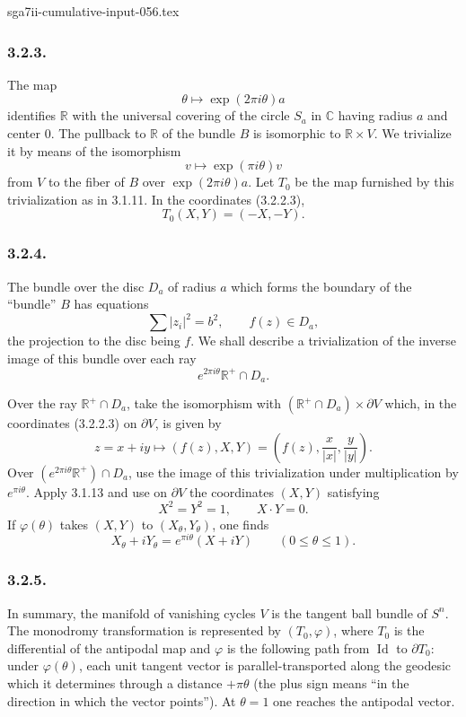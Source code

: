 \begin{filecontents*}{sga7ii-cumulative-input-056.tex}
\subsubsection*{3.2.3.}
The map
\[
\theta\longmapsto \exp(2\pi i\theta)a
\]
identifies $\mathbb R$ with the universal covering of the circle
$S_a$ in $\mathbb C$ having radius $a$ and center $0$.  The pullback
to $\mathbb R$ of the bundle $B$ is isomorphic to $\mathbb R\times V$.
We trivialize it by means of the isomorphism
\[
v\longmapsto \exp(\pi i\theta)v
\]
from $V$ to the fiber of $B$ over $\exp(2\pi i\theta)a$.  Let $T_0$
be the map furnished by this trivialization as in 3.1.11.  In the
coordinates (3.2.2.3),
\[
T_0(X,Y)=(-X,-Y).
\]

\subsubsection*{3.2.4.}
The bundle over the disc $D_a$ of radius $a$ which forms the boundary
of the ``bundle'' $B$ has equations
\[
\sum |z_i|^2=b^2,
\qquad
f(z)\in D_a,
\]
the projection to the disc being $f$.  We shall describe a
trivialization of the inverse image of this bundle over each ray
\[
e^{2\pi i\theta}\mathbb R^+\cap D_a.
\]

Over the ray $\mathbb R^+\cap D_a$, take the isomorphism with
$(\mathbb R^+\cap D_a)\times\partial V$ which, in the coordinates
(3.2.2.3) on $\partial V$, is given by
\[
z=x+iy\longmapsto(f(z),X,Y)
  =\left(f(z),\frac{x}{|x|},\frac{y}{|y|}\right).
\]
Over $(e^{2\pi i\theta}\mathbb R^+)\cap D_a$, use the image of this
trivialization under multiplication by $e^{\pi i\theta}$.  Apply
3.1.13 and use on $\partial V$ the coordinates $(X,Y)$ satisfying
\begin{equation}\tag{3.2.4.1}
X^2=Y^2=1,
\qquad
X\mathbin{\cdot}Y=0.
\end{equation}
If $\varphi(\theta)$ takes $(X,Y)$ to $(X_\theta,Y_\theta)$, one finds
\begin{equation}\tag{3.2.4.2}
X_\theta+iY_\theta
=e^{\pi i\theta}(X+iY)
\qquad(0\leq\theta\leq1).
\end{equation}

\subsubsection*{3.2.5.}
In summary, the manifold of vanishing cycles $V$ is the tangent ball
bundle of $S^n$.  The monodromy transformation is represented by
$(T_0,\varphi)$, where $T_0$ is the differential of the antipodal map
and $\varphi$ is the following path from $\operatorname{Id}$ to
$\partial T_0$: under $\varphi(\theta)$, each unit tangent vector is
parallel-transported along the geodesic which it determines through a
distance $+\pi\theta$ (the plus sign means ``in the direction in which
the vector points'').  At $\theta=1$ one reaches the antipodal vector.


\end{filecontents*}
